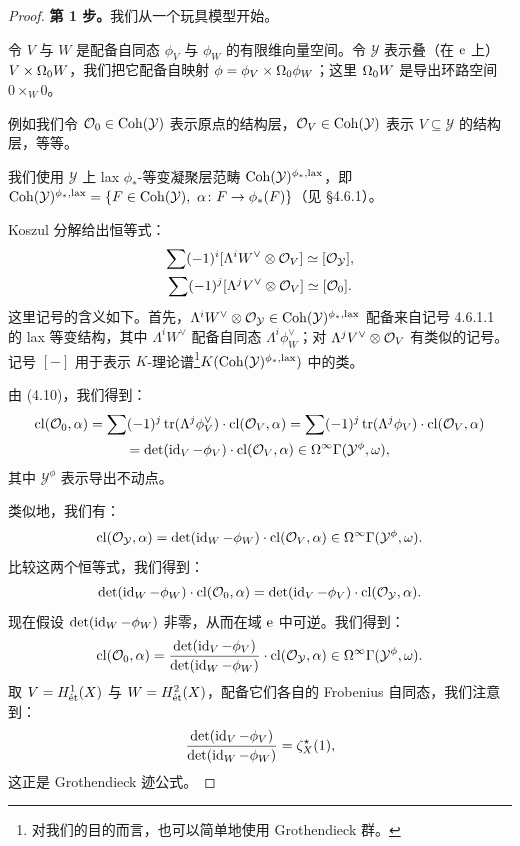 \begin{proof}
\textbf{第 1 步。}我们从一个玩具模型开始。

令 $V$ 与 $W$ 是配备自同态 $\phi_V$ 与 $\phi_W$ 的有限维向量空间。令 $\mathcal{Y}$ 表示叠（在 $\e$ 上）$V\times\Om_0W$，我们把它配备自映射 $\phi=\phi_V\times\Om_0\phi_W$；这里 $\Om_0W$ 是导出环路空间 $0\times_W 0$。

例如我们令 $\OO_0\in\Coh(\mathcal{Y})$ 表示原点的结构层，$\OO_V\in\Coh(\mathcal{Y})$ 表示 $V\subseteq\mathcal{Y}$ 的结构层，等等。

我们使用 $\mathcal{Y}$ 上 lax $\phi_*$-等变凝聚层范畴 $\Coh(\mathcal{Y})^{\phi_*,\mathrm{lax}}$，即
$\Coh(\mathcal{Y})^{\phi_*,\mathrm{lax}}=\{F\in\Coh(\mathcal{Y}),\ \alpha\colon F\to\phi_*(F)\}$（见 §4.6.1）。

Koszul 分解给出恒等式：
\begin{equation}
\begin{gathered}
  \sum(-1)^i[\Lambda^iW^{\vee}\otimes\OO_V]\simeq[\OO_{\mathcal{Y}}],\\
  \sum(-1)^j[\Lambda^jV^{\vee}\otimes\OO_V]\simeq[\OO_0].
\end{gathered}
\end{equation}
这里记号的含义如下。首先，$\Lambda^iW^{\vee}\otimes\OO_{\mathcal{Y}}\in\Coh(\mathcal{Y})^{\phi_*,\mathrm{lax}}$ 配备来自记号 4.6.1.1 的 lax 等变结构，其中 $\Lambda^iW^{\vee}$ 配备自同态 $\Lambda^i\phi_W^{\vee}$；对 $\Lambda^jV^{\vee}\otimes\OO_V$ 有类似的记号。记号 $[-]$ 用于表示 $K$-理论谱\footnote{对我们的目的而言，也可以简单地使用 Grothendieck 群。}$K(\Coh(\mathcal{Y})^{\phi_*,\mathrm{lax}})$ 中的类。

由 (4.10)，我们得到：
\[
\begin{gathered}
  \cl(\OO_0,\alpha)=\sum(-1)^j\tr(\Lambda^j\phi_V^{\vee})\cdot\cl(\OO_V,\alpha)
  =\sum(-1)^j\tr(\Lambda^j\phi_V)\cdot\cl(\OO_V,\alpha)\\
  =\det(\id_V-\phi_V)\cdot\cl(\OO_V,\alpha)\in\Om^\infty\Gamma(\mathcal{Y}^{\phi},\omega),
\end{gathered}
\]
其中 $\mathcal{Y}^{\phi}$ 表示导出不动点。

类似地，我们有：
\[
  \cl(\OO_{\mathcal{Y}},\alpha)=\det(\id_W-\phi_W)\cdot\cl(\OO_V,\alpha)
  \in\Om^\infty\Gamma(\mathcal{Y}^{\phi},\omega).
\]
比较这两个恒等式，我们得到：
\[
  \det(\id_W-\phi_W)\cdot\cl(\OO_0,\alpha)
  =\det(\id_V-\phi_V)\cdot\cl(\OO_{\mathcal{Y}},\alpha).
\]
现在假设 $\det(\id_W-\phi_W)$ 非零，从而在域 $\e$ 中可逆。我们得到：
\[
  \cl(\OO_0,\alpha)=\frac{\det(\id_V-\phi_V)}{\det(\id_W-\phi_W)}\cdot\cl(\OO_{\mathcal{Y}},\alpha)
  \in\Om^\infty\Gamma(\mathcal{Y}^{\phi},\omega).
\]
取 $V=H^1_{\et}(X)$ 与 $W=H^2_{\et}(X)$，配备它们各自的 Frobenius 自同态，我们注意到：
\[
  \frac{\det(\id_V-\phi_V)}{\det(\id_W-\phi_W)}=\zeta^{\star}_X(1),
\]
这正是 Grothendieck 迹公式。


\end{proof}
